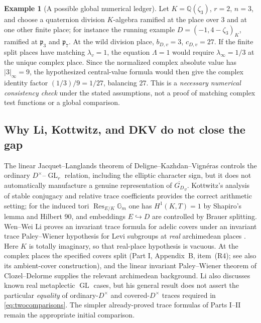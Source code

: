 \documentclass[11pt]{article}
\newcommand{\GL}{\operatorname{GL}}
\newcommand{\GDb}{\overline{G_D}}
\theoremstyle{plain}
\theoremstyle{definition}
\newtheorem{example}[theorem]{Example}
\begin{document}
\begin{example}[A possible global numerical ledger]
\label{ex:ranktwoledger}
Let $K=\mathbb Q(\zeta_3)$, $r=2$, $n=3$, and choose a
quaternion division $K$-algebra ramified at the place over $3$
and at one other finite place; for instance the running example
$D=(-1,4-\zeta_3)_K$, ramified at $\mathfrak p_3$ and $\mathfrak p_7$.  At the wild division place,
$b_{D,v}=3$, $c_{D,v}=27$.  If the finite split places have
matching $\lambda_v=1$, the equation $\Lambda=1$ would require
$\lambda_\infty=1/3$ at the unique complex place.
Since the normalized complex absolute value has
$|3|_\infty=9$, the hypothesized central-value formula would then
give the complex identity factor $(1/3)/9=1/27$, balancing
$27$.  This is a \emph{necessary numerical consistency check}
under the stated assumptions, not a proof of matching complex
test functions or a global comparison.
\end{example}

\subsection{Why Li, Kottwitz, and DKV do not close the gap}\label{subsec:litroute}
The linear Jacquet--Langlands theorem of
Deligne--Kazhdan--Vign\'eras \cite{DKV} controls the ordinary
$D^\times$--$\GL_r$ relation, including the elliptic character
sign, but it does not automatically manufacture a genuine
representation of $\GDb_v$.  Kottwitz's analysis of stable
conjugacy and relative trace coefficients \cite{Kottwitz84}
provides the correct arithmetic setting; for the induced tori
$\operatorname{Res}_{E/K}\mathbb G_m$ one has
$H^1(K,T)=1$ by Shapiro's lemma and Hilbert 90, and embeddings
$E\hookrightarrow D$ are controlled by Brauer splitting.
Wen--Wei Li proves an invariant trace formula for adelic covers
under an invariant trace Paley--Wiener hypothesis for Levi subgroups
at \emph{real} archimedean places \cite{Li14}.  Here $K$ is totally
imaginary, so that real-place hypothesis is vacuous.  At the complex
places the specified covers split (Part I, Appendix~B, item~(R4);
see also its ambient-cover construction), and the linear invariant Paley--Wiener theorem
of Clozel--Delorme \cite{ClozelDelorme} supplies the relevant
archimedean background.  Li also discusses known real metaplectic
$\GL$ cases, but his general result does not assert the particular
\emph{equality} of ordinary-$D^\times$ and covered-$D^\times$
traces required in \eqref{eq:twocomparisons}.  The simpler already-proved trace formulas
of Parts I--II remain the appropriate initial comparison.
\end{document}
